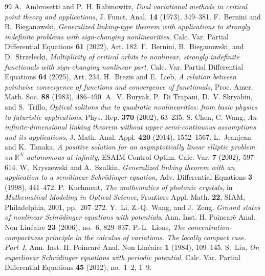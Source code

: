 \documentclass[10pt,a4paper]{amsart}
\numberwithin{equation}{section}
\begin{document}
\begin{thebibliography}{99}
 A.~Ambrosetti and P.~H. Rabinowitz, \emph{Dual variational methods in critical point theory and applications}, J. Funct. Anal. \textbf{14} (1973), 349--381.
 F.~Bernini and B.~Bieganowski, \emph{Generalized linking-type theorem with applications to strongly indefinite problems with sign-changing nonlinearities}, Calc. Var. Partial Differential Equations \textbf{61} (2022), Art. 182.
 F.~Bernini, B.~Bieganowski, and D.~Strzelecki, \emph{Multiplicity of critical orbits to nonlinear, strongly indefinite functionals with sign-changing nonlinear part}, Calc. Var. Partial Differential Equations \textbf{64} (2025), Art. 234.
 H.~Brezis and E.~Lieb, \emph{A relation between pointwise convergence of functions and convergence of functionals}, Proc. Amer. Math. Soc. \textbf{88} (1983), 486--490.
 A.~V. Buryak, P.~Di Trapani, D.~V. Skryabin, and S.~Trillo, \emph{Optical solitons due to quadratic nonlinearities: from basic physics to futuristic applications}, Phys. Rep. \textbf{370} (2002), 63--235.
 S. Chen, C. Wang, \emph{An infinite-dimensional linking theorem without upper semi-continuous assumptions and its applications}, J. Math. Anal. Appl. \textbf{420} (2014), 1552--1567.
 L.~Jeanjean and K.~Tanaka, \emph{A positive solution for an asymptotically linear elliptic problem on $\mathbb{R}^N$ autonomous at infinity}, ESAIM Control Optim. Calc. Var. \textbf{7} (2002), 597--614.
 W.~Kryszewski and A.~Szulkin, \emph{Generalized linking theorem with an application to a semilinear Schrödinger equation}, Adv. Differential Equations \textbf{3} (1998), 441--472.
 P.~Kuchment, \emph{The mathematics of photonic crystals}, in \emph{Mathematical Modeling in Optical Science}, Frontiers Appl. Math. \textbf{22}, SIAM, Philadelphia, 2001, pp.~207--272.
 Y.~Li, Z.-Q.~Wang, and J.~Zeng, \emph{Ground states of nonlinear Schrödinger equations with potentials}, Ann. Inst. H. Poincaré Anal. Non Linéaire \textbf{23} (2006), no.~6, 829--837.
 P.-L.~Lions, \emph{The concentration-compactness principle in the calculus of variations. The locally compact case. Part~I}, Ann. Inst. H. Poincaré Anal. Non Linéaire \textbf{1} (1984), 109--145.
 S.~Liu, \emph{On superlinear Schrödinger equations with periodic potential}, Calc. Var. Partial Differential Equations \textbf{45} (2012), no.~1--2, 1--9.

\end{thebibliography}
\end{document}
